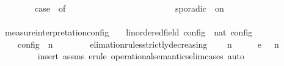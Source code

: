 \begin{isabellebody}
\ \ {\isacharbar}\ {\isacartoucheopen}{\isasymmu}\ {\isacharparenleft}{\isasymphi}\ {\isacharhash}\ {\isasymPhi}{\isacharparenright}\ {\isacharequal}\ {\isacharparenleft}case\ {\isasymphi}\ of\isanewline
\ \ \ \ \ \ \ \ \ \ \ \ \ \ \ \ \ \ \ \ \ \ \ \ {\isacharunderscore}\ sporadic\ {\isacharunderscore}\ on\ {\isacharunderscore}\ {\isasymRightarrow}\ {}\ {\isacharplus}\ {\isasymmu}\ {\isasymPhi}\isanewline
\ \ \ \ \ \ \ \ \ \ \ \ \ \ \ \ \ \ \ \ \ \ {\isacharbar}\ {\isacharunderscore}\ \ \ \ \ \ \ \ \ \ \ \ \ \ \ \ \ {\isasymRightarrow}\ {}\ {\isacharplus}\ {\isasymmu}\ {\isasymPhi}{\isacharparenright}{\isacartoucheclose}\isanewline
\isanewline
{}\isamarkupfalse%
\ measure{\isacharunderscore}interpretation{\isacharunderscore}config\ {\isacharcolon}{\isacharcolon}\ {\isacartoucheopen}{\isacharprime}{\isasymtau}\ {\isacharcolon}{\isacharcolon}\ linordered{\isacharunderscore}field\ config\ {\isasymRightarrow}\ nat{\isacartoucheclose}\ {\isacharparenleft}{\isachardoublequoteopen}{\isasymmu}\isactrlsub c\isactrlsub o\isactrlsub n\isactrlsub f\isactrlsub i\isactrlsub g{\isachardoublequoteclose}{\isacharparenright}\ \isanewline
\ \ \ \ {\isacartoucheopen}{\isasymmu}\isactrlsub c\isactrlsub o\isactrlsub n\isactrlsub f\isactrlsub i\isactrlsub g\ {\isacharparenleft}{\isasymGamma}{\isacharcomma}\ n\ {\isasymturnstile}\ {\isasymPsi}\ {\isasymtriangleright}\ {\isasymPhi}{\isacharparenright}\ {\isacharequal}\ {\isasymmu}\ {\isasymPsi}{\isacartoucheclose}\isanewline
\isanewline
{}\isamarkupfalse%
\ elimation{\isacharunderscore}rules{\isacharunderscore}strictly{\isacharunderscore}decreasing{\isacharcolon}\isanewline
\ \ \ {\isacartoucheopen}{\isacharparenleft}{\isasymGamma}\ n\ {\isasymturnstile}\ {\isasymPsi}\ {\isasymtriangleright}\ {\isasymPhi}\ \ {\isasymhookrightarrow}\isactrlsub e\ \ {\isacharparenleft}{\isasymGamma}\ n\ {\isasymturnstile}\ {\isasymPsi}\ {\isasymtriangleright}\ {\isasymPhi}\isanewline
\ \ \ {\isacartoucheopen}{\isasymmu}\ {\isasymPsi}\ {\isachargreater}\ {\isasymmu}\ {\isasymPsi}\isanewline
%
\isadelimproof
%
\endisadelimproof
%
\isatagproof
{}\isamarkupfalse%
\ {\isacharparenleft}insert\ assms{\isacharcomma}\ erule\ operational{\isacharunderscore}semantics{\isacharunderscore}elim{\isachardot}cases{\isacharcomma}\ auto{\isacharparenright}%

\end{isabellebody}
